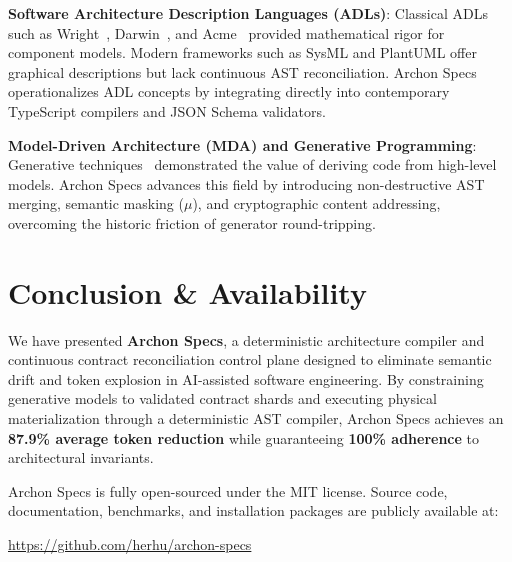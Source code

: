\textbf{Software Architecture Description Languages (ADLs)}: Classical ADLs such as Wright~\cite{allen1997formal}, Darwin~\cite{magee1996dynamic}, and Acme~\cite{garlan2000acme} provided mathematical rigor for component models. Modern frameworks such as SysML and PlantUML offer graphical descriptions but lack continuous AST reconciliation. Archon Specs operationalizes ADL concepts by integrating directly into contemporary TypeScript compilers and JSON Schema validators.

\textbf{Model-Driven Architecture (MDA) and Generative Programming}: Generative techniques~\cite{czarnecki2000generative,kleppe2003mda,steinberg2008emf} demonstrated the value of deriving code from high-level models. Archon Specs advances this field by introducing non-destructive AST merging, semantic masking ($\mu$), and cryptographic content addressing, overcoming the historic friction of generator round-tripping.

\section{Conclusion \& Availability}
\label{sec:conclusion}

We have presented \textbf{Archon Specs}, a deterministic architecture compiler and continuous contract reconciliation control plane designed to eliminate semantic drift and token explosion in AI-assisted software engineering. By constraining generative models to validated contract shards and executing physical materialization through a deterministic AST compiler, Archon Specs achieves an \textbf{87.9\% average token reduction} while guaranteeing \textbf{100\% adherence} to architectural invariants.

Archon Specs is fully open-sourced under the MIT license. Source code, documentation, benchmarks, and installation packages are publicly available at:
\begin{center}
  \url{https://github.com/herhu/archon-specs}
\end{center}





